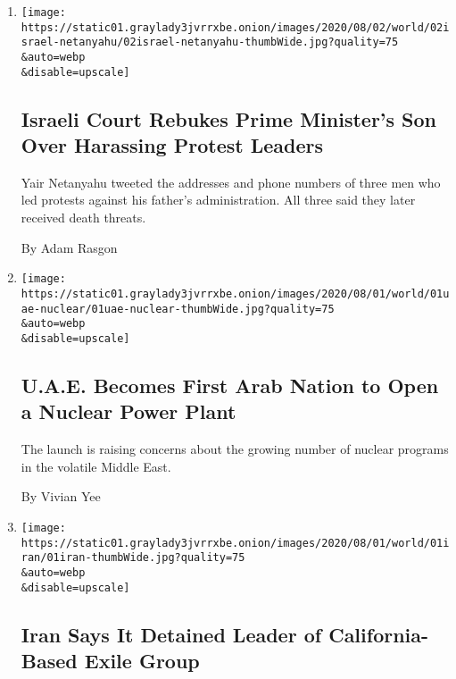 \begin{enumerate}
\def\labelenumi{\arabic{enumi}.}
\item
  \href{/2020/08/02/world/middleeast/israel-Netanyahus-son-tweets.html}{}

  \texttt{[image: https://static01.graylady3jvrrxbe.onion/images/2020/08/02/world/02israel-netanyahu/02israel-netanyahu-thumbWide.jpg?quality=75\\\&auto=webp\\\&disable=upscale]}

  \hypertarget{israeli-court-rebukes-prime-ministers-son-over-harassing-protest-leaders}{%
  \subsection{Israeli Court Rebukes Prime Minister's Son Over Harassing
  Protest
  Leaders}\label{israeli-court-rebukes-prime-ministers-son-over-harassing-protest-leaders}}

  Yair Netanyahu tweeted the addresses and phone numbers of three men
  who led protests against his father's administration. All three said
  they later received death threats.

  By Adam Rasgon
\item
  \href{/2020/08/01/world/middleeast/uae-nuclear-Barakah.html}{}

  \texttt{[image: https://static01.graylady3jvrrxbe.onion/images/2020/08/01/world/01uae-nuclear/01uae-nuclear-thumbWide.jpg?quality=75\\\&auto=webp\\\&disable=upscale]}

  \hypertarget{uae-becomes-first-arab-nation-to-open-a-nuclear-power-plant}{%
  \subsection{U.A.E. Becomes First Arab Nation to Open a Nuclear Power
  Plant}\label{uae-becomes-first-arab-nation-to-open-a-nuclear-power-plant}}

  The launch is raising concerns about the growing number of nuclear
  programs in the volatile Middle East.

  By Vivian Yee
\item
  \href{/2020/08/01/world/middleeast/iran-jamshid-sharmahd-arrested-kingdom-assembly.html}{}

  \texttt{[image: https://static01.graylady3jvrrxbe.onion/images/2020/08/01/world/01iran/01iran-thumbWide.jpg?quality=75\\\&auto=webp\\\&disable=upscale]}

  \hypertarget{iran-says-it-detained-leader-of-california-based-exile-group}{%
  \subsection{Iran Says It Detained Leader of California-Based Exile
  Group}\label{iran-says-it-detained-leader-of-california-based-exile-group}}


\end{enumerate}
